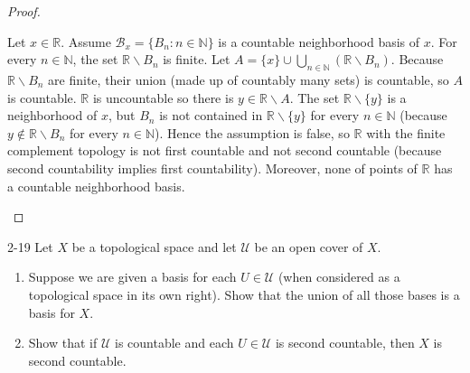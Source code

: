 \begin{proof}
\begin{enumerate}[label={(\alph*)}]
		      Let $x\in\mathbb{R}$. Assume $\mathscr{B}_{x} = \{ B_{n} : n\in\mathbb{N} \}$ is a countable neighborhood basis of $x$. For every $n\in\mathbb{N}$, the set $\mathbb{R}\smallsetminus B_{n}$ is finite. Let $A = \{ x \}\cup \bigcup_{n\in\mathbb{N}}(\mathbb{R}\smallsetminus B_{n})$. Because $\mathbb{R}\smallsetminus B_{n}$ are finite, their union (made up of countably many sets) is countable, so $A$ is countable. $\mathbb{R}$ is uncountable so there is $y\in\mathbb{R}\smallsetminus A$. The set $\mathbb{R}\smallsetminus\{y\}$ is a neighborhood of $x$, but $B_{n}$ is not contained in $\mathbb{R}\smallsetminus\{y\}$ for every $n\in\mathbb{N}$ (because $y\notin \mathbb{R}\smallsetminus B_{n}$ for every $n\in\mathbb{N}$). Hence the assumption is false, so $\mathbb{R}$ with the finite complement topology is not first countable and not second countable (because second countability implies first countability). Moreover, none of points of $\mathbb{R}$ has a countable neighborhood basis.
	\end{enumerate}
\end{proof}

\begin{problem}{2-19}\label{problem:2-19}
Let $X$ be a topological space and let $\mathscr{U}$ be an open cover of $X$.
\begin{enumerate}[label={(\alph*)}]
	\item Suppose we are given a basis for each $U\in\mathscr{U}$ (when considered as a topological space in its own right). Show that the union of all those bases is a basis for $X$.
	\item Show that if $\mathscr{U}$ is countable and each $U\in\mathscr{U}$ is second countable, then $X$ is second countable.
\end{enumerate}
\end{problem}

